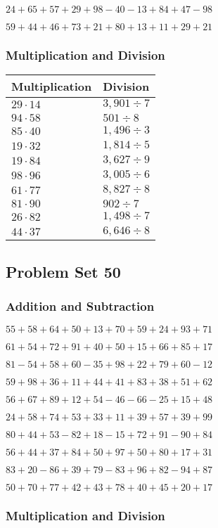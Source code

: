 \(24+65+57+29+98-40-13+84+47-98\)

\(59+44+46+73+21+80+13+11+29+21\)

\hypertarget{multiplication-and-division-89}{%
\subsubsection{Multiplication and
Division}\label{multiplication-and-division-89}}

\begin{longtable}[]{@{}ll@{}}
\toprule
Multiplication & Division\tabularnewline
\midrule
\endhead
\(29\cdot14\) & \(3,901÷7\)\tabularnewline
\(94\cdot58\) & \(501÷8\)\tabularnewline
\(85\cdot40\) & \(1,496÷3\)\tabularnewline
\(19\cdot32\) & \(1,814÷5\)\tabularnewline
\(19\cdot84\) & \(3,627÷9\)\tabularnewline
\(98\cdot96\) & \(3,005÷6\)\tabularnewline
\(61\cdot77\) & \(8,827÷8\)\tabularnewline
\(81\cdot90\) & \(902÷7\)\tabularnewline
\(26\cdot82\) & \(1,498÷7\)\tabularnewline
\(44\cdot37\) & \(6,646÷8\)\tabularnewline
\bottomrule
\end{longtable}

\hypertarget{problem-set-50}{%
\subsection{Problem Set 50}\label{problem-set-50}}

\hypertarget{addition-and-subtraction-90}{%
\subsubsection{Addition and
Subtraction}\label{addition-and-subtraction-90}}

\(55+58+64+50+13+70+59+24+93+ 71\)

\(61+54+72+91+40+50+15+66+85+17\)

\(81-54+58+60-35+98+22+79+60-12\)

\(59+98+36+11+44+41+83+38+51+62\)

\(56+67+89+12+54-46-66-25+15+48\)

\(24+58+74+53+33+11+39+57+39+99\)

\(80+44+53-82+18-15+72+91-90+84\)

\(56+44+37+84+50+97+50+80+17+31\)

\(83+20-86+39+79-83+96+82-94+87\)

\(50+70+77+42+43+78+40+45+20+17\)

\hypertarget{multiplication-and-division-90}{%
\subsubsection{Multiplication and
Division}\label{multiplication-and-division-90}}

